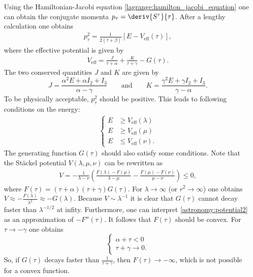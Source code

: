     Using the Hamiltonian-Jacobi equation \eqref{lagrange:hamilton_jacobi_equation} one can obtain the conjugate momenta $p_\tau = \deriv{S^\tau}{\tau}$. After a lengthy calculation one obtains
    \begin{gather}
        p_\tau^2 = \frac{1}{2(\tau+\beta)}\left[E - V_\mathrm{eff}(\tau)\right],
    \end{gather}
    where the effective potential is given by
    \begin{gather}
        V_\mathrm{eff} = \frac{J}{\tau+\alpha} + \frac{K}{\tau+\gamma} - G(\tau).
    \end{gather}
    The two conserved quantities $J$ and $K$ are given by \[J = \frac{\alpha^2E + \alpha I_2 + I_3}{\alpha - \gamma} \qquad\text{and}\qquad K = \frac{\gamma^2E + \gamma I_2 + I_3}{\gamma - \alpha}.\] To be physically acceptable, $p_\tau^2$ should be positive. This leads to following conditions on the energy:
    \begin{gather}
        \begin{cases}
            E&\geq V_\mathrm{eff}(\lambda)\\
            E&\geq V_\mathrm{eff}(\mu)\\
            E&\leq V_\mathrm{eff}(\nu).
        \end{cases}
    \end{gather}
    The generating function $G(\tau)$ should also satisfy some conditions. Note that the St\"ackel potential $V(\lambda,\mu,\nu)$ can be rewritten as
    \begin{gather}
        \label{astronomy:potential2}
        V = -\frac{1}{\lambda - \nu}\left(\frac{F(\lambda) - F(\mu)}{\lambda - \mu} - \frac{F(\mu) - F(\nu)}{\mu - \nu}\right) \leq 0,
    \end{gather}
    where $F(\tau) = (\tau + \alpha)(\tau + \gamma)G(\tau)$. For $\lambda\longrightarrow\infty$ (or $r^2\longrightarrow\infty$) one obtains $V\approx-\frac{F(\lambda)}{\lambda^2}\approx-G(\lambda)$. Because $V\sim \lambda^{-1}$ it is clear that $G(\tau)$ cannot decay faster than $\lambda^{-1/2}$ at infity. Furthermore, one can interpret \eqref{astronomy:potential2} as an approximation of $-F''(\tau)$. It follows that $F(\tau)$ should be convex. For $\tau\longrightarrow-\gamma$ one obtains \[\begin{cases}\alpha + \tau < 0\\\tau + \gamma\longrightarrow 0.\end{cases}\] So, if $G(\tau)$ decays faster than $\frac{1}{\tau + \gamma}$, then $F(\tau)\longrightarrow-\infty$, which is not possible for a convex function.

